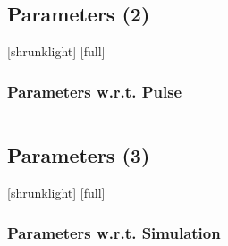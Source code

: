 \documentclass[12pt,compress,aspectratio=169]{beamer} %
\begin{document}
\subsection{Parameters (2)}
[shrunklight]
[full]
\begin{frame}
	\frametitle{Parameters w.r.t. Pulse}
	\centering
	\begin{columns}
	\begin{column}{0.5\textwidth}
	\begin{table}
	\begin{center}
	\end{center}
	\end{table}
	\end{column}
	\begin{column}{0.5\textwidth}
	\end{column}
	\end{columns}	
\end{frame}


\subsection{Parameters (3)}
[shrunklight]
[full]
\begin{frame}
	\frametitle{Parameters w.r.t. Simulation}
	\centering
	\begin{table}
	\begin{center}
	\end{center}
	\end{table}
\end{frame}
\end{document}
